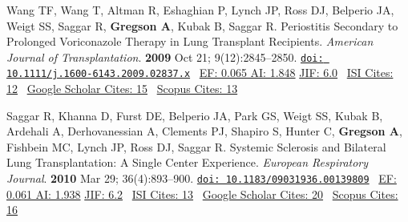 \documentclass[12pt]{moderncv} %
\begin{document}
\begin{thebibliography}{1}
 \bibitem[13]{} Wang TF, Wang T, Altman R, Eshaghian P, Lynch JP, Ross DJ, Belperio JA, Weigt SS, Saggar R, \textbf{Gregson A}, Kubak B, Saggar R. Periostitis Secondary to Prolonged Voriconazole Therapy in Lung Transplant Recipients. {\color{journalcolor}\textit{American Journal of  Transplantation}}. \textbf{2009} Oct 21; 9(12):2845--2850. \href{http://dx.doi.org/10.1111/j.1600-6143.2009.02837.x}{\nolinkurl{doi: 10.1111/j.1600-6143.2009.02837.x}}~ 
   {\color{subsectioncolor}\href{http://www.eigenfactor.org/detail.php?year=2006&jrlname=AM%20J%20TRANSPLANT&issnnum=1600-6135}{{\smaller EF: 0.065 AI: 1.848}} 
       \href{http://admin-apps.webofknowledge.com/JCR/JCR?RQ=RECORD&rank=1&journal=AM+J+TRANSPLANT}{{\smaller JIF: 6.0}}~
       \href{http://apps.webofknowledge.com/CitedFullRecord.do?product=WOS&colName=WOS&SID=4AG6pnd7daKF6IABJdC&search_mode=CitedFullRecord&isickref=WOS:000272127600026}{{\smaller ISI Cites: 12}}~ 
       \href{http://scholar.google.com/scholar?cites=9352467524761589821&as_sdt=2005&sciodt=0,5&hl=en}{{\smaller Google Scholar Cites: 15}}~
       \href{http://www.scopus.com/record/display.url?eid=2-s2.0-72449144605&origin=inward&txGid=2728424DD3A06399B3857C04F09A7B4B.N5T5nM1aaTEF8rE6yKCR3A%3a16}{{\smaller Scopus Cites: 13}}
       }

  \bibitem[14]{} Saggar R, Khanna D, Furst DE, Belperio JA, Park GS, Weigt SS, Kubak B, Ardehali A, Derhovanessian A, Clements PJ, Shapiro S, Hunter C, \textbf{Gregson A}, Fishbein MC, Lynch JP, Ross DJ, Saggar R. Systemic Sclerosis and Bilateral Lung Transplantation: A Single Center Experience. {\color{journalcolor}\textit{European Respiratory Journal}}. \textbf{2010} Mar 29; 36(4):893--900. \href{http://dx.doi.org/10.1183/09031936.00139809}{\nolinkurl{doi: 10.1183/09031936.00139809}}~ 
    {\color{subsectioncolor}\href{http://www.eigenfactor.org/detail.php?year=2008&jrlname=EUR%20RESPIR%20J&issnnum=0903-1936}{{\smaller EF: 0.061 AI: 1.938}} 
        \href{http://admin-apps.webofknowledge.com/JCR/JCR?RQ=RECORD&rank=1&journal=EUR+RESPIR+J}{{\smaller JIF: 6.2}}~
        \href{http://apps.webofknowledge.com/CitedFullRecord.do?product=WOS&colName=WOS&SID=4AG6pnd7daKF6IABJdC&search_mode=CitedFullRecord&isickref=WOS:000282473700032}{{\smaller ISI Cites: 13}}~ 
        \href{http://scholar.google.com/scholar?cites=9510861874112920695&as_sdt=2005&sciodt=0,5&hl=en}{{\smaller Google Scholar Cites: 20}}~
        \href{http://www.scopus.com/record/display.url?eid=2-s2.0-77957848190&origin=inward&txGid=2728424DD3A06399B3857C04F09A7B4B.N5T5nM1aaTEF8rE6yKCR3A%3a14}{{\smaller Scopus Cites: 16}}
        }


\end{thebibliography}
\end{document}
